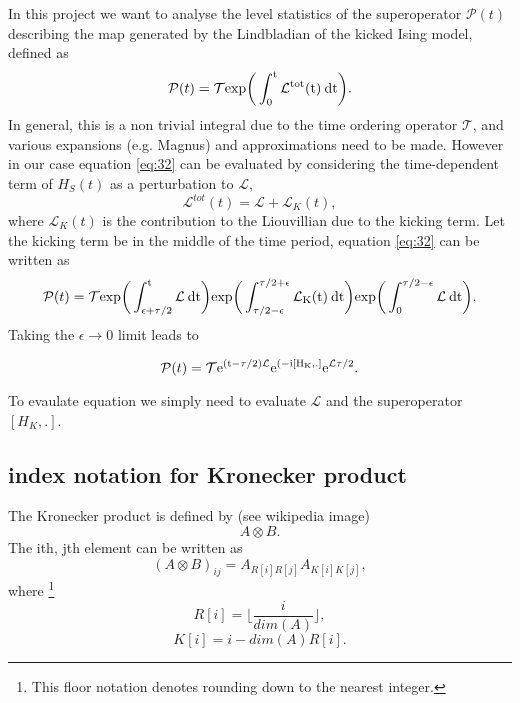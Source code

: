 \documentclass[10pt]{article}
\numberwithin{equation}{section}
\begin{document}
In this project we want to analyse the level statistics of the superoperator $\mathcal{P}(t)$ describing the map generated by the Lindbladian of the kicked Ising model, defined as 
\begin{equation} \label{eq:32}
\mathcal{P}(t) = \mathcal{T}\rm exp\bigg( \int_{0}^{t}\mathcal{L}^{\rm tot}(t)\:dt \bigg).
\end{equation}
In general, this is a non trivial integral due to the time ordering operator $\mathcal{T}$, and various expansions (e.g. Magnus) and approximations need to be made. However in our case equation \ref{eq:32} can be evaluated by considering the time-dependent term of $H_{S}(t)$ as a perturbation to $\mathcal{L}$,
\begin{equation}
\mathcal{L}^{tot}(t) = \mathcal{L} + \mathcal{L}_{K}(t),
\end{equation}
where $\mathcal{L}_{K}(t)$ is the contribution to the Liouvillian due to the kicking term. Let the kicking term be in the middle of the time period, equation \ref{eq:32} can be written as 
\begin{align}
\mathcal{P}(t) &= \mathcal{T}\rm exp\bigg( \int_{\epsilon+\tau/2}^{t}\mathcal{L}\:dt \bigg) exp\bigg( \int_{\tau/2 - \epsilon}^{\tau/2 +\epsilon}\mathcal{L}_{K}(t)\:dt \bigg) exp\bigg( \int_{0}^{\tau/2 - \epsilon}\mathcal{L}\:dt \bigg).\\
\end{align}
Taking the $\epsilon \to 0$ limit leads to 

\begin{equation} \label{eq:33}
\mathcal{P}(t) =   \mathcal{T}\rm e^{(t - \tau/2)\mathcal{L}} e^{(-i[H_{K},.]} e^{\mathcal{L}\tau/2}.
\end{equation}

To evaulate equation \label{eq:33} we simply need to evaluate $\mathcal{L}$ and the superoperator $[H_{K},.]$.

\subsection{index notation for Kronecker product}

The Kronecker product is defined by (see wikipedia image)
\begin{equation}
 A\otimes B.
\end{equation}
The ith, jth element can be written as 
\begin{equation}
 (A\otimes B)_{ij} = A_{R[i]R[j]}A_{K[i]K[j]},
\end{equation}
where \footnote{This floor notation denotes rounding down to the nearest integer.}
\begin{equation}
R[i] = \lfloor \frac{i}{dim(A)}\rfloor,
\end{equation}
\begin{equation}
K[i] = i - dim(A)R[i].
\end{equation}
\end{document}
